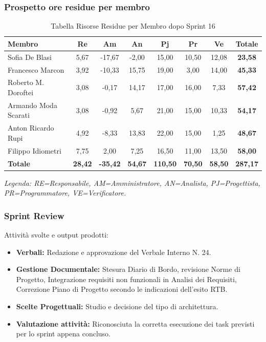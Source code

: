\subsubsection{Prospetto ore residue per membro}
\begin{table}[H]
    \centering
    \renewcommand{\arraystretch}{1.3}
    \begin{tabularx}{\textwidth}{|X|c|c|c|c|c|c|c|}
        \hline
        \textbf{Membro} & \textbf{Re} & \textbf{Am} & \textbf{An} &
        \textbf{Pj} & \textbf{Pr} & \textbf{Ve} & \textbf{Totale} \\
        \hline
        Sofia De Blasi       &  5,67 & -17,67 &  -2,00 & 15,00 & 10,50 & 12,08 & \textbf{23,58} \\
        Francesco Marcon     &  3,92 &  -10,33 & 15,75 & 19,00 &  3,00 & 14,00 & \textbf{45,33} \\
        Roberto M. Doroftei  &  3,08 &  -0,17 & 14,17 & 17,00 & 16,00 &  7,33 & \textbf{57,42} \\
        Armando Moda Scarati &  3,08 &  -0,92 &  5,67 & 21,00 & 15,00 & 10,33 & \textbf{54,17} \\
        Anton Ricardo Rupi   &  4,92 &  -8,33 & 13,83 & 22,00 & 15,00 &  1,25 & \textbf{48,67} \\
        Filippo Idiometri    &  7,75 &   2,00 &  7,25 & 16,50 & 11,00 & 13,50 & \textbf{58,00} \\
        \hline
        \textbf{Totale} &
        \textbf{28,42} & \textbf{-35,42} & \textbf{54,67} &
        \textbf{110,50} & \textbf{70,50} & \textbf{58,50} &
        \textbf{287,17} \\
        \hline
    \end{tabularx}
    \begin{minipage}{\textwidth}
        \smallskip
        \footnotesize\textit{Legenda: RE=Responsabile, AM=Amministratore,
        AN=Analista, PJ=Progettista, PR=Programmatore, VE=Verificatore.}
    \end{minipage}
    \caption{Tabella Risorse Residue per Membro dopo Sprint 16}
\end{table}

\subsubsection{Sprint Review}
Attività svolte e output prodotti:
\begin{itemize}
    \item \textbf{Verbali:} Redazione e approvazione del Verbale Interno N. 24.
    \item \textbf{Gestione Documentale:} Stesura Diario di Bordo, revisione Norme di Progetto, Integrazione requisiti non funzionali in Analisi dei Requisiti, Correzione Piano di Progetto secondo le indicazioni dell'esito RTB.
    \item \textbf{Scelte Progettuali:} Studio e decisione del tipo di architettura.
    \item \textbf{Valutazione attività:} Riconosciuta la corretta esecuzione dei task previsti per lo sprint appena concluso.
\end{itemize}

